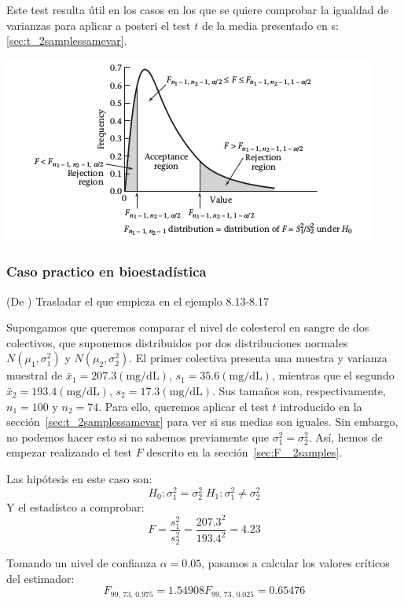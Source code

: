 \documentclass[a4paper,12pt]{article}
\begin{document}
    Este test resulta útil en los casos en los que se quiere comprobar la igualdad de varianzas para aplicar a posteri el test $t$  de la media presentado en s: \ref{sec:t_2samplessamevar}.


\includegraphics{ejemplo_grafica.png}

\subsubsection*{Caso practico en bioestadística}
 (De \cite{rosner2015fundamentals}) Trasladar el que empieza en el ejemplo 8.13-8.17 

    Supongamos que queremos comparar el nivel de colesterol en sangre de dos colectivos, que suponemos distribuidos por dos distribuciones normales $N(\mu_1, \sigma_1^2)$ y $N(\mu_2, \sigma_2^2)$.
    El primer colectiva presenta una muestra y varianza muestral de $\bar{x}_1 = 207.3 (\textrm{mg/dL})$, $s_1 = 35.6 (\textrm{mg/dL})$, mientras que el segundo $\bar{x}_2 = 193.4 (\textrm{mg/dL})$, $s_2 = 17.3 (\textrm{mg/dL})$.
    Sus tamaños son, respectivamente, $n_1 = 100$ y $n_2 = 74$.
    Para ello, queremos aplicar el test $t$ introducido en la sección~\ref{sec:t_2samplessamevar} para ver si sus medias son iguales.
    Sin embargo, no podemos hacer esto si no sabemos previamente que $\sigma_1^2 = \sigma_2^2$.
    Así, hemos de empezar realizando el test $F$ descrito en la sección~\ref{sec:F_
2samples}.

    Las hipótesis en este caso son:
    \begin{equation}
	H_0:\sigma^2_1=\sigma^2_2 \; H_1:\sigma^2_1\neq \sigma^2_2
    \end{equation}
    Y el estadístco a comprobar:
    $$F
    =
    \frac{s_1^2}{s_2^2}
    = 
    \frac{207.3^2}{193.4^2}
    =
    4.23
    $$

    Tomando un nivel de confianza $\alpha = 0.05$, pasamos a calcular los valores críticos del estimador:
    \begin{equation}
        F_{99,\, 73,\, 0.975} = 1.54908
        F_{99,\, 73,\, 0.025} = 0.65476
    \end{equation}
\end{document}
